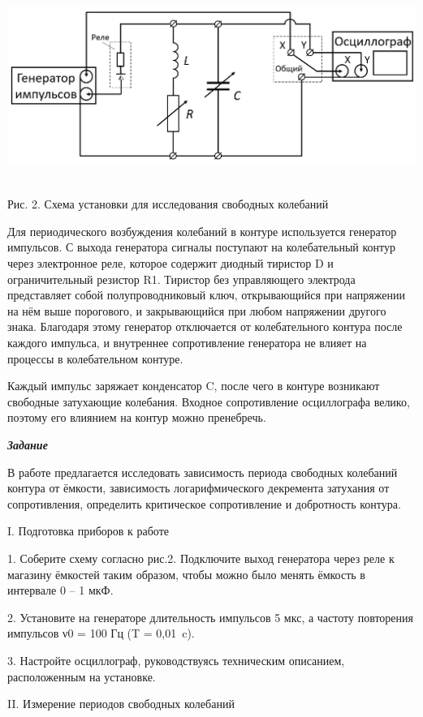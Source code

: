 \includegraphics[width=6.49653in,height=2.48611in]{./media/image2.png}

Рис. 2. Схема установки для исследования свободных колебаний

Для периодического возбуждения колебаний в контуре используется
генератор импульсов. С выхода генератора сигналы поступают на
колебательный контур через электронное реле, которое содержит диодный
тиристор D и ограничительный резистор R1. Тиристор без управляющего
электрода представляет собой полупроводниковый ключ, открывающийся при
напряжении на нём выше порогового, и закрывающийся при любом напряжении
другого знака. Благодаря этому генератор отключается от колебательного
контура после каждого импульса, и внутреннее сопротивление генератора не
влияет на процессы в колебательном контуре.

Каждый импульс заряжает конденсатор C, после чего в контуре возникают
свободные затухающие колебания. Входное сопротивление осциллографа
велико, поэтому его влиянием на контур можно пренебречь.

\emph{\textbf{Задание}}

В работе предлагается исследовать зависимость периода свободных
колебаний контура от ёмкости, зависимость логарифмического декремента
затухания от сопротивления, определить критическое сопротивление и
добротность контура.

I. Подготовка приборов к работе

1. Соберите схему согласно рис.2. Подключите выход генератора через реле
к магазину ёмкостей таким образом, чтобы можно было менять ёмкость в
интервале 0 -- 1 мкФ.

2. Установите на генераторе длительность импульсов 5 мкс, а частоту
повторения импульсов ν0 = 100 Гц (T = 0,01~c).

3. Настройте осциллограф, руководствуясь техническим описанием,
расположенным на установке.

II. Измерение периодов свободных колебаний

